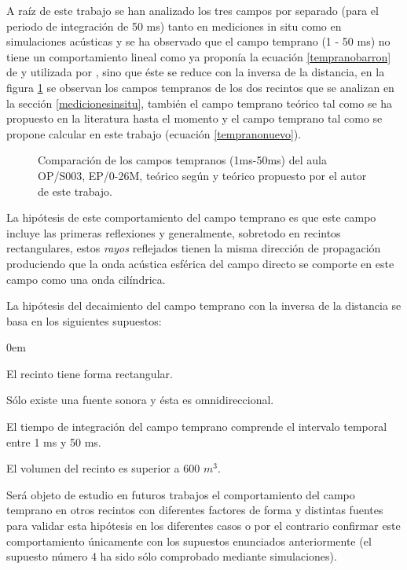 A raíz de este trabajo se han analizado los tres campos por separado (para el periodo de integración de 50 ms) tanto en mediciones in situ como en simulaciones acústicas y se ha observado que el campo temprano (1 - 50 ms) no tiene un comportamiento lineal como ya proponía la ecuación \ref{tempranobarron} de \citeauthor{Barron1988} y utilizada por \cite{Sato2008}, sino que éste se reduce con la inversa de la distancia, en la figura \ref{graf:campostempranos} se observan los campos tempranos de los dos recintos que se analizan en la sección \ref{medicionesinsitu}, también el campo temprano teórico tal como se ha propuesto en la literatura hasta el momento y el campo temprano tal como se propone calcular en este trabajo (ecuación \ref{tempranonuevo}).

\begin{figure}[ht]
    \centering
    {
    
    }
    \caption{Comparación de los campos tempranos (1ms-50ms)  del aula OP/S003, EP/0-26M, teórico según \cite{Sato2008} y teórico propuesto por el autor de este trabajo.}
    \label{graf:campostempranos}
\end{figure}
\FloatBarrier



La hipótesis de este comportamiento del campo temprano es que este campo incluye las primeras reflexiones y generalmente, sobretodo en recintos rectangulares, estos \textit{rayos} reflejados tienen la misma dirección de propagación produciendo que la onda acústica esférica del campo directo se comporte en este campo como una onda cilíndrica.

La hipótesis del decaimiento del campo temprano con la inversa de la distancia se basa en los siguientes supuestos:
\begin{description}
\itemsep0em
	\item[Supuesto 1:] El recinto tiene forma rectangular.
	 \item[Supuesto 2:] Sólo existe una fuente sonora y ésta es omnidireccional.
	 \item[Supuesto 3:] El tiempo de integración del campo temprano comprende el intervalo temporal entre 1 ms y 50 ms.
	 \item[Supuesto 4:] El volumen del recinto es superior a 600 $m^3$.
\end{description}

Será objeto de estudio en futuros trabajos el comportamiento del campo temprano en otros recintos con diferentes factores de forma y distintas fuentes para validar esta hipótesis en los diferentes casos o por el contrario confirmar este comportamiento únicamente con los supuestos enunciados anteriormente (el supuesto número 4 ha sido sólo comprobado mediante simulaciones).
\\
\par


